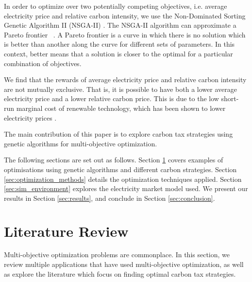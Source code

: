 In order to optimize over two potentially competing objectives, i.e. average electricity price and relative carbon intensity, we use the Non-Dominated Sorting Genetic Algorithm II (NSGA-II) \cite{Valkanas2014}. The NSGA-II algorithm can approximate a Pareto frontier ~\cite{Pareto1927, Stadler1979}. A Pareto frontier is a curve in which there is no solution which is better than another along the curve for different sets of parameters. In this context, better means that a solution is closer to the optimal for a particular combination of objectives.

We find that the rewards of average electricity price and relative carbon intensity are not mutually exclusive. That is, it is possible to have both a lower average electricity price and a lower relative carbon price. This is due to the low short-run marginal cost of renewable technology, which has been shown to lower electricity prices \cite{OMahoney2011}.

The main contribution of this paper is to explore carbon tax strategies using genetic algorithms for multi-objective optimization. 

The following sections are set out as follows. Section \ref{sec:lit_review} covers examples of optimisations using genetic algorithms and different carbon strategies. Section \ref{sec:optimization_methods} details the optimization techniques applied. Section \ref{sec:sim_environment} explores the electricity market model used. We present our results in Section \ref{sec:results}, and conclude in Section \ref{sec:conclusion}.











\section{Literature Review}
\label{sec:lit_review}

Multi-objective optimization problems are commonplace. In this section, we review multiple applications that have used multi-objective optimization, as well as explore the literature which focus on finding optimal carbon tax strategies.

